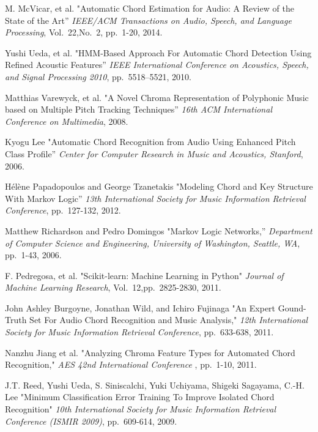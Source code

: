 \documentclass{article}
\begin{document}
\begin{thebibliography}{citations}

M. McVicar, et al.
"Automatic Chord Estimation for Audio: A Review of the State of the Art''
{\it IEEE/ACM Transactions on Audio, Speech, and Language Processing},
Vol.~22,No.~2, pp.~1-20, 2014.

Yushi Ueda, et al.
"HMM-Based Approach For Automatic Chord Detection Using Refined Acoustic
Features''
{\it IEEE International Conference on Acoustics, Speech, and Signal Processing 2010},
pp.~5518--5521, 2010.

Matthias Varewyck, et al.
"A Novel Chroma Representation of Polyphonic Music based on Multiple Pitch
Tracking Techniques''
{\it 16th ACM International Conference on Multimedia},
2008.

Kyogu Lee
"Automatic Chord Recognition from Audio Using Enhanced Pitch Class Profile''
{\it Center for Computer Research in Music and Acoustics, Stanford},
2006.

Hélène Papadopoulos and George Tzanetakis
"Modeling Chord and Key Structure With Markov Logic''
{\it 13th International Society for Music Information Retrieval Conference},
pp.~127-132, 2012.

Matthew Richardson and Pedro Domingos
"Markov Logic Networks,''
{\it Department of Computer Science and Engineering, University of Washington, Seattle, WA},
pp.~1-43, 2006.

F. Pedregosa, et al.
"Scikit-learn: Machine Learning in Python"
{\it Journal of Machine Learning Research},
Vol.~12,pp.~2825-2830, 2011.

John Ashley Burgoyne, Jonathan Wild, and Ichiro Fujinaga
"An Expert Gound-Truth Set For Audio Chord Recognition and Music Analysis,"
{\it 12th International Society for Music Information Retrieval Conference},
pp.~633-638, 2011.

Nanzhu Jiang et al.
"Analyzing Chroma Feature Types for Automated Chord Recognition,"
{\it AES 42nd International Conference },
pp.~1-10, 2011.

J.T. Reed, Yushi Ueda, S. Siniscalchi, Yuki Uchiyama, Shigeki Sagayama, C.-H. Lee
"Minimum Classification Error Training To Improve Isolated Chord Recognition"
{\it 10th International Society for Music Information Retrieval Conference (ISMIR 2009)},
pp.~609-614, 2009.


\end{thebibliography}
\end{document}
